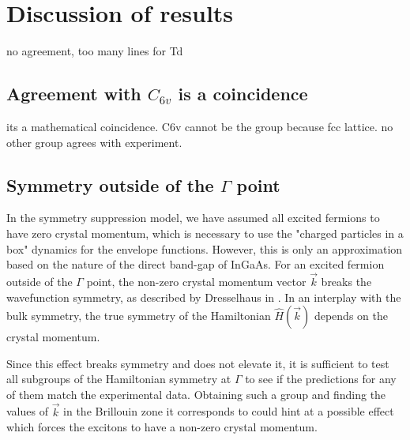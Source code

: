 \section{Discussion of results}

no agreement, too many lines for Td

\subsection{Agreement with $C_{6v}$ is a coincidence}
its a mathematical coincidence. C6v cannot be the group because fcc lattice. no other group agrees with experiment.


\subsection{Symmetry outside of the $\Gamma$ point}
In the symmetry suppression model, we have assumed all excited fermions to have zero crystal momentum, which is necessary to use the "charged particles in a box" dynamics for the envelope functions. However, this is only an approximation based on the nature of the direct band-gap of InGaAs. For an excited fermion outside of the $\Gamma$ point, the non-zero crystal momentum vector $\vec{k}$ breaks the wavefunction symmetry, as described by Dresselhaus in \cite[Ch. 13]{dresselhaus}. In an interplay with the bulk symmetry, the true symmetry of the Hamiltonian $\hat{H}\left(\vec{k}\right)$ depends on the crystal momentum.

Since this effect breaks symmetry and does not elevate it, it is sufficient to test all subgroups of the Hamiltonian symmetry at $\Gamma$ to see if the predictions for any of them match the experimental data. Obtaining such a group and finding the values of $\vec{k}$ in the Brillouin zone it corresponds to could hint at a possible effect which forces the excitons to have a non-zero crystal momentum.


